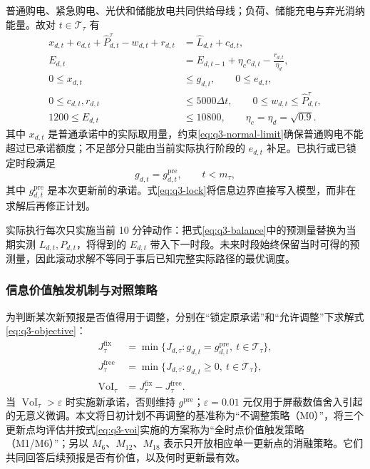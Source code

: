普通购电、紧急购电、光伏和储能放电共同供给母线；负荷、储能充电与弃光消纳能量。故对 $t\in\mathcal T_\tau$ 有
\begin{align}
x_{d,t}+e_{d,t}+\widehat P_{d,t}^{\tau}-w_{d,t}+r_{d,t}&=\widehat L_{d,t}+c_{d,t},\label{eq:q3-balance}\\
E_{d,t}&=E_{d,t-1}+\eta_c c_{d,t}-\frac{r_{d,t}}{\eta_d},\label{eq:q3-soc}\\
0\le x_{d,t}&\le g_{d,t},\qquad 0\le e_{d,t},\label{eq:q3-normal-limit}\\
0\le c_{d,t},r_{d,t}&\le5000\Delta t,\qquad0\le w_{d,t}\le\widehat P_{d,t}^{\tau},\label{eq:q3-power-limit}\\
1200\le E_{d,t}&\le10800,\qquad \eta_c=\eta_d=\sqrt{0.9}.\label{eq:q3-soc-limit}
\end{align}
其中 $x_{d,t}$ 是普通承诺中的实际取用量，约束\eqref{eq:q3-normal-limit}确保普通购电不能超过已承诺额度；不足部分只能由当前实际执行阶段的 $e_{d,t}$ 补足。已执行或已锁定时段满足
\begin{equation}
g_{d,t}=g_{d,t}^{\mathrm{pre}},\qquad t<m_\tau,
\label{eq:q3-lock}
\end{equation}
其中 $g_{d,t}^{\mathrm{pre}}$ 是本次更新前的承诺。式\eqref{eq:q3-lock}将信息边界直接写入模型，而非在求解后再修正计划。

实际执行每次只实施当前 10 分钟动作：把式\eqref{eq:q3-balance}中的预测量替换为当期实测 $L_{d,t},P_{d,t}$，将得到的 $E_{d,t}$ 带入下一时段。未来时段始终保留当时可得的预测量，因此滚动求解不等同于事后已知完整实际路径的最优调度。

\subsubsection{信息价值触发机制与对照策略}

为判断某次新预报是否值得用于调整，分别在“锁定原承诺”和“允许调整”下求解式\eqref{eq:q3-objective}：
\begin{align}
J_{\tau}^{\mathrm{fix}}&=\min\{J_{d,\tau}:g_{d,t}=g_{d,t}^{\mathrm{pre}},\ t\in\mathcal T_\tau\},\\
J_{\tau}^{\mathrm{free}}&=\min\{J_{d,\tau}:g_{d,t}\ge0,\ t\in\mathcal T_\tau\},\\
\operatorname{VoI}_{\tau}&=J_{\tau}^{\mathrm{fix}}-J_{\tau}^{\mathrm{free}}.
\label{eq:q3-voi}
\end{align}
当 $\operatorname{VoI}_{\tau}>\varepsilon$ 时实施新承诺，否则维持 $g^{\mathrm{pre}}$；$\varepsilon=0.01$ 元仅用于屏蔽数值舍入引起的无意义微调。本文将日初计划不再调整的基准称为“不调整策略（M0）”，将三个更新点均评估并按式\eqref{eq:q3-voi}实施的方案称为“全时点价值触发策略（M1/M6）”；另以 $M_6$、$M_{12}$、$M_{18}$ 表示只开放相应单一更新点的消融策略。它们共同回答后续预报是否有价值，以及何时更新最有效。
